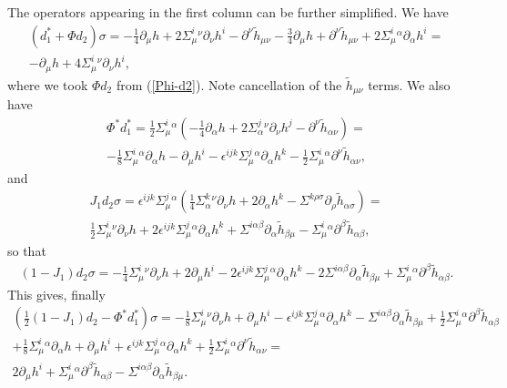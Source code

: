\documentclass[10pt]{report}
\theoremstyle{definition}
\begin{document}
The operators appearing in the first column can be further simplified. We have
\begin{align}
(d_1^* +  \Phi d_2)\sigma =  -\frac{1}{4}\partial_\mu h + 2\Sigma^i_\mu{}^\nu \partial_\nu h^i -  \partial^\nu \tilde{h}_{\mu\nu}  - \frac{3}{4} \partial_\mu h + \partial^\nu \tilde{h}_{\mu\nu} + 2 \Sigma^i_\mu{}^\alpha\partial_\alpha h^i = \\ \nonumber
- \partial_\mu h + 4\Sigma^i_\mu{}^\nu \partial_\nu h^i,
\end{align}
where we took $\Phi d_2$ from (\ref{Phi-d2}). Note cancellation of the $\tilde{h}_{\mu\nu}$ terms. We also have
\begin{align}
\Phi^* d_1^* = \frac{1}{2} \Sigma^i_\mu{}^\alpha ( -\frac{1}{4}\partial_\alpha h + 2\Sigma^j_\alpha{}^\nu \partial_\nu h^j -  \partial^\nu \tilde{h}_{\alpha\nu} ) = \\ \nonumber
- \frac{1}{8} \Sigma^i_\mu{}^\alpha \partial_\alpha h - \partial_\mu h^i - \epsilon^{ijk} \Sigma^j_\mu{}^\alpha \partial_\alpha h^k - \frac{1}{2}  \Sigma^i_\mu{}^\alpha \partial^\nu \tilde{h}_{\alpha\nu} , 
\end{align}
and
\begin{align}
J_1 d_2 \sigma = \epsilon^{ijk} \Sigma^j_\mu{}^\alpha ( \frac{1}{4} \Sigma^k_\alpha{}^\nu \partial_\nu h +2 \partial_\alpha h^k -  \Sigma^{k\rho\sigma} \partial_\rho \tilde{h}_{\alpha\sigma} )= \\ \nonumber
\frac{1}{2} \Sigma^i_\mu{}^\nu \partial_\nu h + 2 \epsilon^{ijk} \Sigma^j_\mu{}^\alpha \partial_\alpha h^k + \Sigma^{i\alpha\beta} \partial_\alpha \tilde{h}_{\beta\mu}-
\Sigma^{i}_\mu{}^\alpha \partial^\beta \tilde{h}_{\alpha\beta},
\end{align}
so that
\begin{align}
(1-J_1)d_2\sigma =- \frac{1}{4} \Sigma^i_\mu{}^\nu \partial_\nu h +2 \partial_\mu h^i  - 2 \epsilon^{ijk} \Sigma^j_\mu{}^\alpha \partial_\alpha h^k - 2\Sigma^{i\alpha\beta} \partial_\alpha \tilde{h}_{\beta\mu}+
\Sigma^{i}_\mu{}^\alpha \partial^\beta \tilde{h}_{\alpha\beta}.
\end{align}
This gives, finally
\begin{align}\nonumber
\left(\frac{1}{2}(1-J_1) d_2 - \Phi^*d_1^*\right)\sigma = - \frac{1}{8} \Sigma^i_\mu{}^\nu \partial_\nu h + \partial_\mu h^i  -  \epsilon^{ijk} \Sigma^j_\mu{}^\alpha \partial_\alpha h^k - \Sigma^{i\alpha\beta} \partial_\alpha \tilde{h}_{\beta\mu}+\frac{1}{2} 
\Sigma^{i}_\mu{}^\alpha \partial^\beta \tilde{h}_{\alpha\beta} \\ \nonumber
+ \frac{1}{8} \Sigma^i_\mu{}^\alpha \partial_\alpha h + \partial_\mu h^i + \epsilon^{ijk} \Sigma^j_\mu{}^\alpha \partial_\alpha h^k + \frac{1}{2}  \Sigma^i_\mu{}^\alpha \partial^\nu \tilde{h}_{\alpha\nu} = \\ \nonumber
2 \partial_\mu h^i+\Sigma^{i}_\mu{}^\alpha \partial^\beta \tilde{h}_{\alpha\beta}- \Sigma^{i\alpha\beta} \partial_\alpha \tilde{h}_{\beta\mu}.
\end{align}
\end{document}
